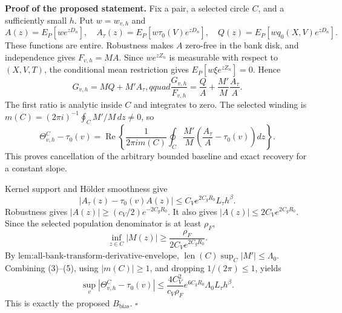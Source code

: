 \textbf{Proof of the proposed statement.}
Fix a pair, a selected circle \(C\), and a sufficiently small \(h\).  Put \(w=w_{v,h}\) and
\[
 A(z)=E_P[we^{zD_n}],\quad
 A_\tau(z)=E_P[w\tau_0(V)e^{zD_n}],\quad
 Q(z)=E_P[wq_0(X,V)e^{zD_n}]. \tag{1}
\]
These functions are entire.  Robustness makes \(A\) zero-free in the bank disk, and independence gives \(F_{v,h}=MA\).  Since \(we^{zZ_n}\) is measurable with respect to \((X,V,T)\), the conditional mean restriction gives \(E_P[w\xi e^{zZ_n}]=0\).  Hence
\[
 G_{v,h}=MQ+M'A_\tau,qquad
 \frac{G_{v,h}}{F_{v,h}}=\frac QA+\frac{M'}M\frac{A_\tau}{A}. \tag{2}
\]
The first ratio is analytic inside \(C\) and integrates to zero.  The selected winding is \(m(C)=(2\pi i)^{-1}\oint_C M'/M\,dz\ne0\), so
\[
 \Theta^C_{v,h}-\tau_0(v)
 =\operatorname{Re}\left\{\frac1{2\pi i m(C)}\oint_C\frac{M'}M
 \left(\frac{A_\tau}{A}-\tau_0(v)\right)dz\right\}. \tag{3}
\]
This proves cancellation of the arbitrary bounded baseline and exact recovery for a constant slope.

Kernel support and H\"older smoothness give
\[
 |A_\tau(z)-\tau_0(v)A(z)|
 \le C_Ve^{2C_gR_0}L_\tau h^\beta. \tag{4}
\]
Robustness gives \(|A(z)|\ge(c_V/2)e^{-2C_gR_0}\).  It also gives \(|A(z)|\le2C_Ve^{2C_gR_0}\).  Since the selected population denominator is at least \(\rho_F\),
\[
 \inf_{z\in C}|M(z)|\ge\frac{\rho_F}{2C_Ve^{2C_gR_0}}. \tag{5}
\]
By \(\text{lem:all-bank-transform-derivative-envelope}\), \(\operatorname{len}(C)\sup_C|M'|\le\Lambda_0\).  Combining (3)--(5), using \(|m(C)|\ge1\), and dropping \(1/(2\pi)\le1\), yields
\[
 \sup_v|\Theta^C_{v,h}-\tau_0(v)|
 \le\frac{4C_V^2}{c_V\rho_F}e^{6C_gR_0}\Lambda_0L_\tau h^\beta.
\]
This is exactly the proposed \(B_{\mathrm{bias}}\). \(\square\)